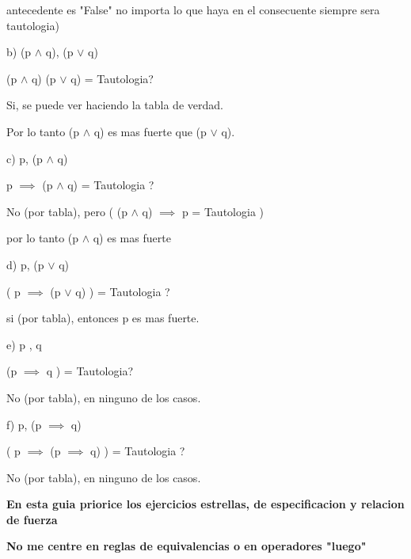 \documentclass[10pt,a4paper]{article}
\begin{document}
antecedente es "False" no importa lo que haya en el consecuente siempre sera tautologia)

\vspace{0.3cm}

b) (p $\wedge$ q), (p $\vee$ q)


(p $\wedge$ q) \implies (p $\vee$ q) = Tautologia? 

Si, se puede ver haciendo la tabla de verdad.

Por lo tanto (p $\wedge$ q) es mas fuerte que (p $\vee$ q).

\vspace{0.3cm}

c) p, (p $\wedge$ q)

p $\implies$ (p $\wedge$ q) = Tautologia ?

No (por tabla), pero ( (p $\wedge$ q) $\implies$ p = Tautologia )

por lo tanto (p $\wedge$ q) es mas fuerte 

\vspace{0.3cm}

d) p, (p $\vee$ q)

( p $\implies$ (p $\vee$ q) ) = Tautologia ? 

si (por tabla), entonces p es mas fuerte.



\vspace{0.3cm}

e) p , q 

(p $\implies$ q ) = Tautologia?

No (por tabla), en ninguno de los casos.



\vspace{0.3cm}

f) p, (p $\implies$ q)

( p $\implies$ (p $\implies$ q) ) = Tautologia ? 

No (por tabla), en ninguno de los casos.

\vspace{0.3cm}

\textbf{En esta guia priorice los ejercicios estrellas, de especificacion y relacion de fuerza}

\textbf{No me centre en reglas de equivalencias o en operadores "luego" }








\end{document}
